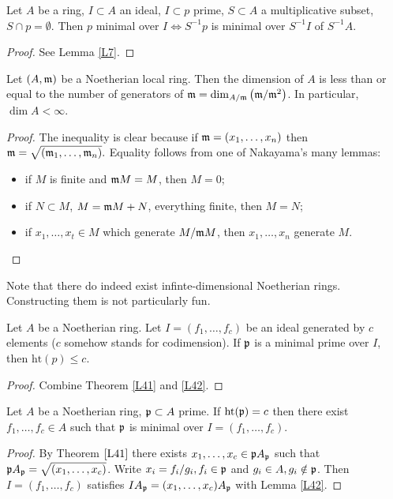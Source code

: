 \documentclass{../mathnotes}
\begin{document}
\begin{lem}
\label{L42}
Let $A$ be a ring, $I\subset A$ an ideal, $I\subset p$ prime, $S\subset A$ a multiplicative subset, $S\cap p = \emptyset$. Then $p$ minimal over $I \Leftrightarrow S^{-1}p$ is minimal over $S^{-1}I$ of $S^{-1}A$.
\end{lem}

\begin{proof}
See Lemma \ref{L7}.
\end{proof}




\begin{lem}
\label{L43}
Let $(A,\mathfrak m)$ be a Noetherian local ring. Then the dimension of $A$ is less than or equal to the number of generators of $\mathfrak m=\dim_{A/\mathfrak m}\left(\mathfrak m/\mathfrak m^2\right)$. In particular, $\dim A<\infty$.
\end{lem}
\begin{proof}
The inequality is clear because if $\mathfrak m=(x_1,\ldots,x_n)$ then $\mathfrak m=\sqrt{(\mathfrak m_1,\ldots,\mathfrak m_n)}.$ Equality follows from one of Nakayama's many lemmas:
\begin{itemize}
\item if $M$ is finite and $\mathfrak m M=M$, then $M=0$;
\item if $N\subset M$, $M=\mathfrak mM+N$, everything finite, then $M=N$;
\item if $x_1,\ldots,x_t\in M$ which generate $M/\mathfrak mM$, then $x_1,\ldots, x_n$ generate $M$.
\end{itemize}
\end{proof}

\begin{rem}
Note that there do indeed exist infinte-dimensional Noetherian rings. Constructing them is not particularly fun.
\end{rem}

\begin{lem}
\label{L44}
Let $A$ be a Noetherian ring. Let $I=(f_1,\ldots,f_c)$ be an ideal generated by $c$ elements ($c$ somehow stands for codimension). If $\mathfrak p$ is a minimal prime over $I$, then $\text{ht}(p)\leq c$.
\end{lem}
\begin{proof}
Combine Theorem \ref{L41} and \ref{L42}.
\end{proof}

\begin{lem}
\label{L45}
Let $A$ be a Noetherian ring, $\mathfrak p\subset A$ prime. If $\text{ht}(\mathfrak p)=c$ then there exist $f_1,\ldots, f_c\in A$ such that $\mathfrak p$ is minimal over $I=(f_1,\ldots,f_c)$.
\end{lem}
\begin{proof}
By Theorem $\ref{L41}$ there exists $x_1,\ldots, x_c\in\mathfrak pA_\mathfrak p$ such that $\mathfrak pA_\mathfrak p=\sqrt{(x_1,\ldots,x_c)}$. Write $x_i=f_i/g_i,f_i\in\mathfrak p$ and $g_i\in A,g_i\notin\mathfrak p$. Then $I=(f_1,\ldots, f_c)$ satisfies $IA_\mathfrak p=(x_1,\ldots,x_c)A_\mathfrak p$ with Lemma \ref{L42}.
\end{proof}
\end{document}
